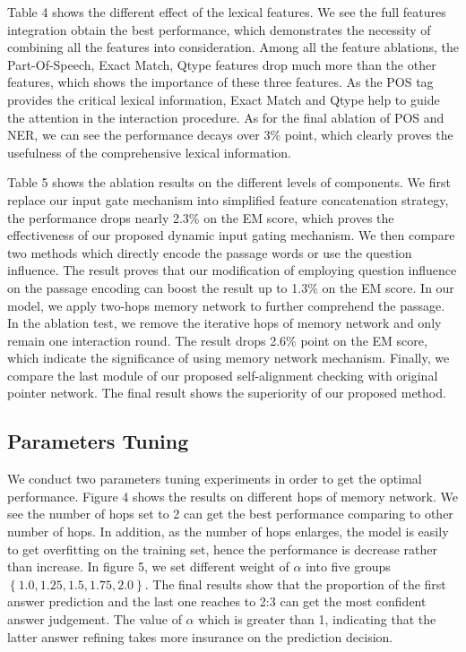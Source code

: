 \documentclass[letterpaper]{article} \usepackage{aaai18}  \usepackage{times}  \usepackage{helvet}  \usepackage{courier}  \usepackage{url}  \usepackage{graphicx}  \usepackage{booktabs}
\begin{document}
Table 4 shows the different effect of the lexical features. We see the full features integration obtain the best performance, which demonstrates the necessity of combining all the features into consideration. Among all the feature ablations, the Part-Of-Speech, Exact Match, Qtype features drop much more than the other features, which shows the importance of these three features. As the POS tag provides the critical lexical information, Exact Match and Qtype help to guide the attention in the interaction procedure. As for the final ablation of POS and NER, we can see the performance decays over 3\% point, which clearly proves the usefulness of the comprehensive lexical information.   

Table 5 shows the ablation results on the different levels of components. We first replace our input gate mechanism into simplified feature concatenation strategy, the performance drops nearly 2.3\% on the EM score, which proves the effectiveness of our proposed dynamic input gating mechanism. We then compare two methods which directly encode the passage words or use the question influence. The result proves that our modification of employing question influence on the passage encoding can boost the result up to 1.3\% on the EM score. In our model, we apply two-hops memory network to further comprehend the passage. In the ablation test, we remove the iterative hops of memory network and only remain one interaction round. The result drops 2.6\% point on the EM score, which indicate the significance of using memory network mechanism. Finally, we compare the last module of our proposed self-alignment checking with original pointer network. The final result shows the superiority of our proposed method.

\subsection{Parameters Tuning}
We conduct two parameters tuning experiments in order to get the optimal performance. Figure 4 shows the results on different hops of memory network. We see the number of hops set to 2 can get the best performance comparing to other number of hops. In addition, as the number of hops enlarges, the model is easily to get overfitting on the training set, hence the performance is decrease rather than increase. In figure 5, we set different weight of $\alpha$ into five groups $\left\{1.0,1.25,1.5,1.75,2.0\right\}$. The final results show that the proportion of the first answer prediction and the last one reaches to 2:3 can get the most confident answer judgement. The value of $\alpha$ which is greater than 1, indicating that the latter answer refining takes more insurance on the prediction decision.
\end{document}

